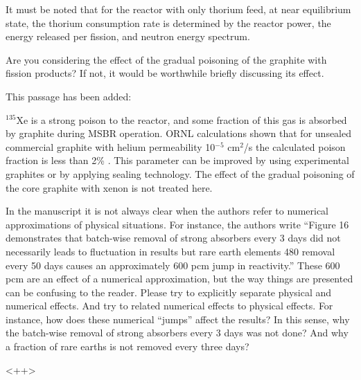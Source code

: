\documentclass[answers,11pt]{exam}
\begin{document}
\begin{questions}
\begin{solution}
                It must be noted that for the reactor with only thorium feed, 
                at near equilibrium state, the thorium consumption rate is 
				determined by the reactor power, the energy released per fission, 
				and neutron energy spectrum.
        \end{solution}


        \question Are you considering the effect of the gradual poisoning of 
        the graphite with fission products? If not, it would be worthwhile 
        briefly discussing its effect.
        \begin{solution}
                This passage has been added:
				
				$^{135}$Xe is a strong poison to the reactor, and some 
				fraction of this gas is absorbed by graphite during MSBR
				operation. ORNL calculations shown that for unsealed commercial 
				graphite with helium permeability 10$^{-5}$ cm$^2$/s the 
				calculated poison fraction is less than 2\% \cite{robertson_conceptual_1971}. 
				This parameter can be improved by using experimental graphites 
				or by applying sealing technology. The effect of the gradual 
				poisoning of the core graphite with xenon is not treated here.
        \end{solution}


        \question In the manuscript it is not always clear when the authors 
        refer to numerical approximations of physical situations. For instance, 
        the authors write ``Figure 16 demonstrates that batch-wise removal of 
        strong absorbers every 3 days did not necessarily leads to fluctuation 
        in results but rare earth elements 480 removal every 50 days causes an 
        approximately 600 pcm jump in reactivity.'' These 600 pcm are an effect 
        of a numerical approximation, but the way things are presented can be 
        confusing to the reader. Please try to explicitly separate physical and 
        numerical effects. And try to related numerical effects to physical 
        effects. For instance, how does these numerical ``jumps'' affect the 
        results?  In this sense, why the batch-wise removal of strong absorbers 
        every 3 days  was not done? And why a fraction of rare earths  is not 
        removed every three days?
        \begin{solution}
                <++>
        \end{solution}


\end{questions}
\end{document}
